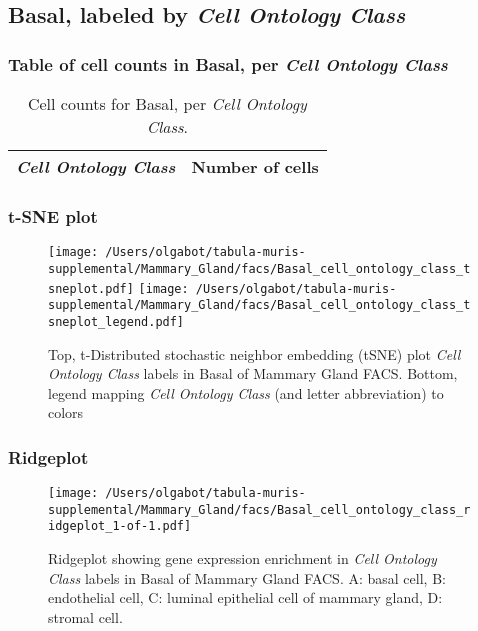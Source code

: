 \clearpage

\subsection{Basal, labeled by \emph{Cell Ontology Class}}
\subsubsection{Table of cell counts in Basal, per \emph{Cell Ontology Class}}\begin{table}[h]
\centering
\label{my-label}
\begin{tabular}{@{}ll@{}}
\toprule

\emph{Cell Ontology Class}& Number of cells \\ \midrule\bottomrule
\end{tabular}
\caption{Cell counts for Basal, per \emph{Cell Ontology Class}.}
\end{table}

\clearpage
\subsubsection{t-SNE plot}
\begin{figure}[h]
\centering
\texttt{[image: /Users/olgabot/tabula-muris-supplemental/Mammary\_Gland/facs/Basal\_cell\_ontology\_class\_tsneplot.pdf]}
\texttt{[image: /Users/olgabot/tabula-muris-supplemental/Mammary\_Gland/facs/Basal\_cell\_ontology\_class\_tsneplot\_legend.pdf]}
\caption{Top, t-Distributed stochastic neighbor embedding (tSNE) plot  \emph{Cell Ontology Class} labels in Basal of Mammary Gland FACS. Bottom, legend mapping \emph{Cell Ontology Class} (and letter abbreviation) to colors}
\end{figure}


\clearpage

\subsubsection{Ridgeplot}
\begin{figure}[h]
\centering
\texttt{[image: /Users/olgabot/tabula-muris-supplemental/Mammary\_Gland/facs/Basal\_cell\_ontology\_class\_ridgeplot\_1-of-1.pdf]}

\caption{ Ridgeplot  showing gene expression enrichment in \emph{Cell Ontology Class} labels in Basal of Mammary Gland FACS. A: basal cell, B: endothelial cell, C: luminal epithelial cell of mammary gland, D: stromal cell.}
\end{figure}



